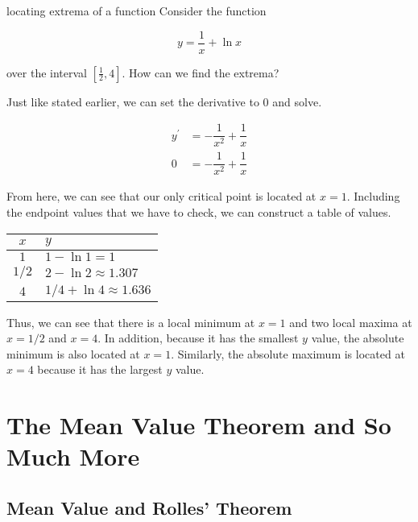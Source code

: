\begin{example}{locating extrema of a function}
    Consider the function
    
    \[ y = \dfrac{1}{x} + \ln{x} \]
    
    over the interval \( \left[\frac{1}{2}, 4 \right] \). How can we find the extrema?
    
    \vspace{0.3cm}
    
    Just like stated earlier, we can set the derivative to \( 0 \) and solve.
    
    \begin{align}
        y^\prime &= -\dfrac{1}{x^2} + \dfrac{1}{x} \\
        0 &= -\dfrac{1}{x^2} + \dfrac{1}{x}
    \end{align}
    
    From here, we can see that our only critical point is located at \( x = 1 \). Including the endpoint values that we have to check, we can construct a table of values.
    
    \begin{center}
    \begin{tabular}{c|l}
        \( x \) & \( y \) \\
        \hline
        \( 1 \) & \( 1 - \ln{1} = 1 \) \\
        \( 1 / 2 \) & \( 2 - \ln{2} \approx 1.307 \) \\
        \( 4 \) & \( 1/4 + \ln{4} \approx 1.636 \)
    \end{tabular}
    \end{center}
    
    Thus, we can see that there is a local minimum at \( x = 1 \) and two local maxima at \( x = 1/2 \) and \( x = 4 \). In addition, because it has the smallest \( y \) value, the absolute minimum is also located at \( x = 1 \). Similarly, the absolute maximum is located at \( x = 4 \) because it has the largest \( y \) value.
\end{example}

\section{The Mean Value Theorem and So Much More}

\subsection{Mean Value and Rolles' Theorem}

